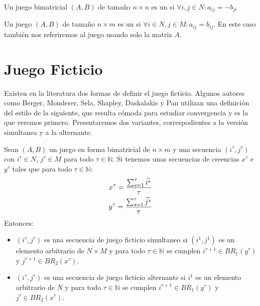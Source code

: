\begin{definition}
    Un juego bimatricial $(A, B)$ de tamaño $n \times n$ es un  si $\forall i, j \in N : a_{ij} = -b_{ji}$
\end{definition}

\begin{definition}
    Un juego $(A, B)$ de tamaño $n \times m$ es un  si $\forall i \in N, j \in M : a_{ij} = b_{ij}$. En este caso también nos referiremos al juego usando solo la matriz $A$.
\end{definition}


\section{Juego Ficticio} \label{sec:def:fp}


Existen en la literatura dos formas de definir el juego ficticio. Algunos autores como Berger, Monderer, Sela, Shapley, Daskalakis y Pan \cite{browns:original} \cite{no:cycling} \cite{2x2:without} \cite{identical:interests} \cite{counter:karlin:strong} utilizan una definición del estilo de la siguiente, que resulta cómoda para estudiar convergencia y es la que veremos primero. Presentaremos dos variantes, correspodientes a la versión simultanea y a la alternante.


\begin{definition} \label{def:fp:berger}
    Sean $(A, B)$ un juego en forma bimatricial de $n \times m$ y una secuencia $(i^\tau, j^\tau)$ con $i^\tau \in N$, $j^\tau \in M$ para todo $\tau \in \mathbb{N}$. Si tenemos unas secuencias de creencias $x^\tau$ e $y^\tau$ tales que para todo $\tau \in \mathbb{N}$:
    \begin{gather*}
        x^\tau= \frac{\sum^\tau_{s=1} \widetilde{i^s}}{\tau}  \\
        y^\tau= \frac{\sum^\tau_{s=1} \widetilde{j^s}}{\tau}
    \end{gather*}
    Entonces:
    \begin{itemize}
        \item $(i^\tau, j^\tau)$ es una secuencia de juego ficticio simultaneo si $(i^1, j^1)$ es un elemento arbitrario de $N \times M$ y para todo $\tau \in \mathbb{N}$ se cumplen $i^{\tau+1} \in BR_1(y^\tau)$ y $j^{\tau+1} \in BR_2(x^\tau)$.
        \item $(i^\tau, j^\tau)$ es una secuencia de juego ficticio alternante si $i^1$ es un elemento arbitrario de $N$ y para todo $\tau \in \mathbb{N}$ se cumplen $i^{\tau+1} \in BR_1(y^\tau)$ y $j^{\tau} \in BR_2(x^\tau)$.
    \end{itemize}
\end{definition}

